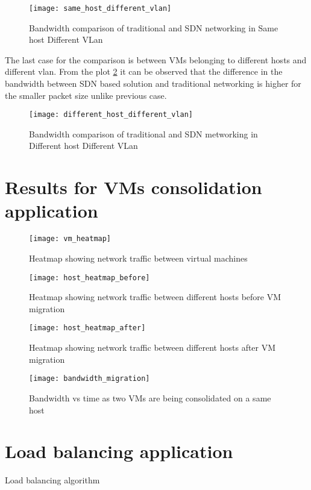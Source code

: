 \begin{figure}
\caption{Bandwidth comparison of traditional and SDN networking in Same host Different VLan}
\centering
\texttt{[image: same\_host\_different\_vlan]}
\label{fig:SamehostdifVLan}
\end{figure}

\newpage

The last case for the comparison is between VMs belonging to different hosts and different vlan. From the plot \ref{fig:difhostdifVLan} it can be observed that the difference in the bandwidth between SDN based solution and traditional networking  is higher for the smaller packet size unlike previous case. 

\begin{figure}[h]
\caption{Bandwidth comparison of traditional and SDN metworking in Different host Different VLan}
\centering
\texttt{[image: different\_host\_different\_vlan]}
\label{fig:difhostdifVLan}
\end{figure}


\section{Results for VMs consolidation application}
\begin{figure}[h]
\caption{Heatmap showing network traffic between virtual machines}
\centering
\texttt{[image: vm\_heatmap]}
\end{figure}

\begin{figure}[h]
\caption{Heatmap showing network traffic between different hosts before VM migration}
\centering
\texttt{[image: host\_heatmap\_before]}
\end{figure}

\begin{figure}[h]
\caption{Heatmap showing network traffic between different hosts after VM migration}
\centering
\texttt{[image: host\_heatmap\_after]}
\end{figure}

\begin{figure}[h]
\caption{Bandwidth vs time as two VMs are being consolidated on a same host}
\centering
\texttt{[image: bandwidth\_migration]}
\end{figure}

\newpage
\section{Load balancing application}
\begin{algorithm}[H]
\SetAlgoLined

\caption{Load balancing algorithm}
\end{algorithm}

